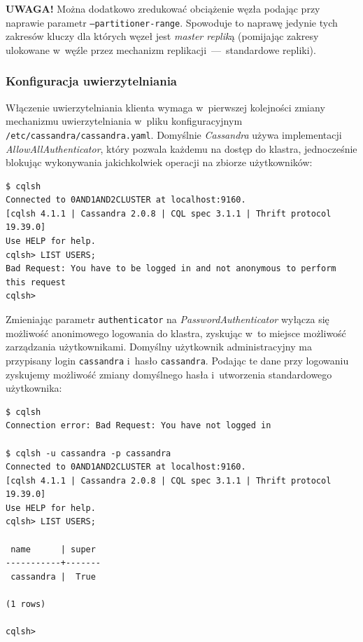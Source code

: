 \documentclass{article} %
\begin{document}
\bigskip

\noindent\textbf{UWAGA!} Można dodatkowo zredukować obciążenie węzła podając przy naprawie parametr \texttt{--partitioner-range}.
Spowoduje to naprawę jedynie tych zakresów kluczy dla których węzeł jest \emph{master replik}ą (pomijając zakresy ulokowane w~węźle przez mechanizm replikacji~---~standardowe repliki).

\pagebreak

\subsubsection{Konfiguracja uwierzytelniania}\label{subsec:cluster_misc_auth}

Włączenie uwierzytelniania klienta wymaga w~pierwszej kolejności zmiany mechanizmu uwierzytelniania w~pliku konfiguracyjnym \texttt{/etc/cassandra/cassandra.yaml}.
Domyślnie \emph{Cassandra} używa implementacji \emph{AllowAllAuthenticator}, który pozwala każdemu na dostęp do klastra, jednocześnie blokując wykonywania jakichkolwiek operacji na zbiorze użytkowników:

\begin{lstlisting}[style=bash, caption={wypisanie listy zdefiniowanych użytkowników przy wyłączonym uwierzytelnianiu}]
$ cqlsh
Connected to 0AND1AND2CLUSTER at localhost:9160.
[cqlsh 4.1.1 | Cassandra 2.0.8 | CQL spec 3.1.1 | Thrift protocol 19.39.0]
Use HELP for help.
cqlsh> LIST USERS;
Bad Request: You have to be logged in and not anonymous to perform this request
cqlsh>
\end{lstlisting}

Zmieniając parametr \texttt{authenticator} na \emph{PasswordAuthenticator} wyłącza się możliwość anonimowego logowania do klastra, zyskując w~to miejsce możliwość zarządzania użytkownikami.
Domyślny użytkownik administracyjny ma przypisany login \texttt{cassandra} i~hasło \texttt{cassandra}.
Podając te dane przy logowaniu zyskujemy możliwość zmiany domyślnego hasła i~utworzenia standardowego użytkownika:

\begin{lstlisting}[style=bash, caption={włączenie uwierzytelniania przy dostępie do klastra przez \texttt{cqlsh}}]
$ cqlsh
Connection error: Bad Request: You have not logged in

$ cqlsh -u cassandra -p cassandra
Connected to 0AND1AND2CLUSTER at localhost:9160.
[cqlsh 4.1.1 | Cassandra 2.0.8 | CQL spec 3.1.1 | Thrift protocol 19.39.0]
Use HELP for help.
cqlsh> LIST USERS;

 name      | super
-----------+-------
 cassandra |  True

(1 rows)

cqlsh>
\end{lstlisting}
\end{document}
